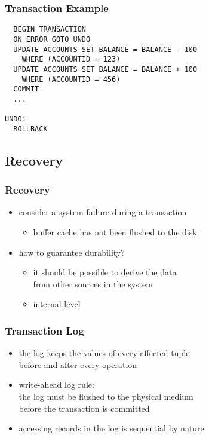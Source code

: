 \documentclass[dvipsnames]{beamer}
\theoremstyle{plain}
\begin{document}
\begin{frame}[fragile]
  \frametitle{Transaction Example}

  \begin{example}
    \begin{lstlisting}
  BEGIN TRANSACTION
  ON ERROR GOTO UNDO
  UPDATE ACCOUNTS SET BALANCE = BALANCE - 100
    WHERE (ACCOUNTID = 123)
  UPDATE ACCOUNTS SET BALANCE = BALANCE + 100
    WHERE (ACCOUNTID = 456)
  COMMIT
  ...

UNDO:
  ROLLBACK
    \end{lstlisting}
  \end{example}
\end{frame}

\subsection{Recovery}

\begin{frame}
  \frametitle{Recovery}

  \begin{itemize}
    \item consider a system failure during a transaction
    \begin{itemize}
      \item buffer cache has not been flushed to the disk
    \end{itemize}

    \pause
    \item how to guarantee durability?
    \begin{itemize}
      \item it should be possible to derive the data\\
	from other sources in the system
      \item internal level
    \end{itemize}
  \end{itemize}
\end{frame}

\begin{frame}
  \frametitle{Transaction Log}

  \begin{itemize}
    \item the \alert{log} keeps the values of every affected tuple\\
      before and after every operation

    \pause
    \medskip
    \item \alert{write-ahead log rule}:\\
      the log must be flushed to the physical medium\\
      before the transaction is committed

    \pause
    \medskip
    \item accessing records in the log is sequential by nature
  \end{itemize}
\end{frame}
\end{document}

